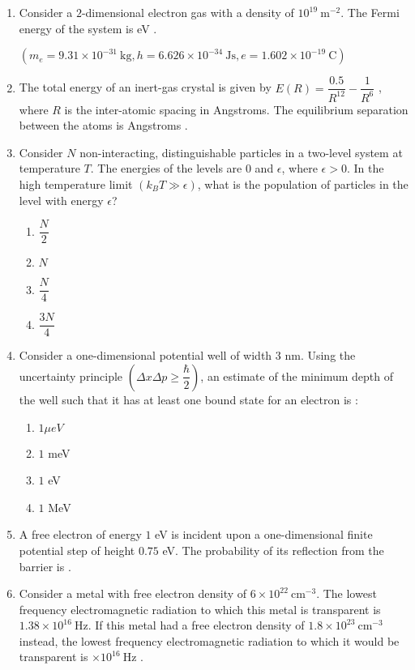 \documentclass{article}
\newcommand{\brak}[1]{\left( #1 \right)}
\newcommand{\gt}{>}
\begin{document}
\begin{enumerate}
\item Consider a $2$-dimensional electron gas with a density of $10^{19}~\text{m}^{-2}$. The Fermi energy of the system is eV . 

$\brak{m_e = 9.31 \times 10^{-31}~\text{kg}, h = 6.626 \times 10^{-34}~\text{Js}, e = 1.602 \times 10^{-19}~\text{C}}$

\item The total energy of an inert-gas crystal is given by $E\brak{R} = \dfrac{0.5}{R^{12}} - \dfrac{1}{R^6}$ , where $R$ is the inter-atomic spacing in Angstroms. The equilibrium separation between the atoms is Angstroms .

\item Consider $N$ non-interacting, distinguishable particles in a two-level system at temperature $T$. The energies of the levels are $0$ and  
 $\epsilon$, where $\epsilon \gt 0$. In the high temperature limit $\brak{k_B T \gg \epsilon}$, what is the population of particles in the level with energy $\epsilon$?

\begin{enumerate}
    \item $\dfrac{N}{2}$
    \item $N$
    \item $\dfrac{N}{4}$
    \item $\dfrac{3N}{4}$
\end{enumerate}

\item Consider a one-dimensional potential well of width $3$ nm. Using the uncertainty principle $\brak{\Delta x \Delta p \geq \dfrac{\hbar}{2}}$, an estimate of the minimum depth of the well such that it has at least one bound state for an electron is :

\begin{enumerate}
    \item $1 \mu eV$
    \item $1$ meV
    \item $1$ eV
    \item $1$ MeV
\end{enumerate}

\item A free electron of energy $1$ eV is incident upon a one-dimensional finite potential step of height $0.75$ eV. The probability of its reflection from the barrier is .

 \item Consider a metal with free electron density of $6 \times 10^{22}~\text{cm}^{-3}$. The lowest frequency electromagnetic radiation to which this metal is transparent is $1.38 \times 10^{16}~\text{Hz}$. If this metal had a free electron density of $1.8 \times 10^{23}~\text{cm}^{-3}$ instead, the lowest frequency electromagnetic radiation to which it would be transparent is  $\times 10^{16}~\text{Hz}$ .


\end{enumerate}
\end{document}
